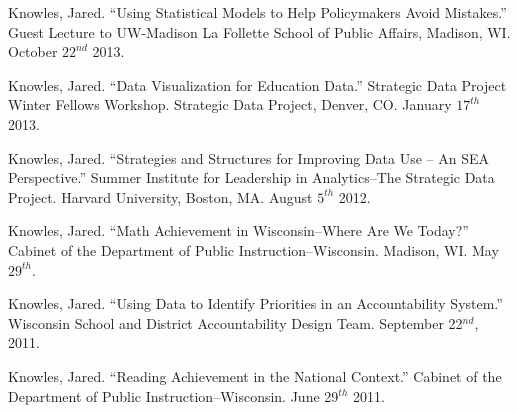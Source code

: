 \documentclass[margin,line]{res}
\begin{document}
\begin{resume}
Knowles, Jared. ``Using Statistical Models to Help Policymakers Avoid Mistakes.'' Guest Lecture to UW-Madison La Follette School of Public Affairs, Madison, WI. October $22^{nd}$ 2013.

Knowles, Jared. ``Data Visualization for Education Data.'' Strategic Data Project Winter Fellows Workshop. Strategic Data Project, Denver, CO. January $17^{th}$ 2013. 

Knowles, Jared. ``Strategies and Structures for Improving Data Use -- An SEA Perspective.'' Summer Institute for Leadership in Analytics--The Strategic Data Project. Harvard University, Boston, MA. August $5^{th}$ 2012. 


Knowles, Jared. ``Math Achievement in Wisconsin--Where Are We Today?'' Cabinet of the Department of Public Instruction--Wisconsin. Madison, WI. May $29^{th}$. 



Knowles, Jared. ``Using Data to Identify Priorities in an Accountability System.'' Wisconsin School and District Accountability Design Team. September 22$^{nd}$, 2011.



Knowles, Jared. ``Reading Achievement in the National Context.'' Cabinet of the Department of Public Instruction--Wisconsin. June 29$^{th}$ 2011.

% 


\end{resume}
\end{document}
